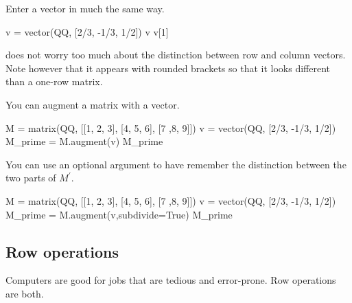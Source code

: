 Enter a vector in much the same way.
\begin{sageoutput}
v = vector(QQ, [2/3, -1/3, 1/2])
v
v[1]
\end{sageoutput}
\noindent
\Sage{} does not worry too much about the distinction between row and column
vectors.
Note however that
it appears with rounded brackets so that 
it looks different than a one-row matrix.

You can augment a matrix with a vector.
\begin{sageoutput}
M = matrix(QQ, [[1, 2, 3], [4, 5, 6], [7 ,8, 9]])
v = vector(QQ, [2/3, -1/3, 1/2])
M_prime = M.augment(v)
M_prime
\end{sageoutput}
\noindent
You can use an optional argument to
have \Sage{} remember the distinction between the two parts 
of $M^\prime$.
\begin{sageoutput}[d,0,2]
M = matrix(QQ, [[1, 2, 3], [4, 5, 6], [7 ,8, 9]])
v = vector(QQ, [2/3, -1/3, 1/2])
M_prime = M.augment(v,subdivide=True)
M_prime                              
\end{sageoutput}



\subsection{Row operations}
Computers are good for jobs that are tedious and error-prone.
Row operations are both.

